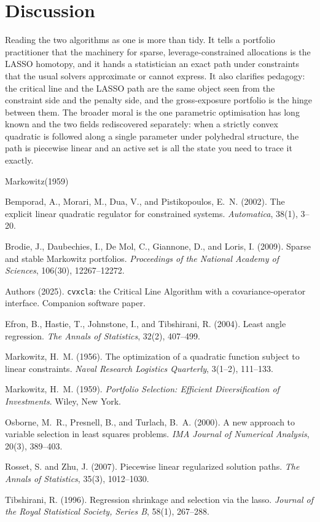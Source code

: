 \documentclass[11pt]{article}
\begin{document}
\section{Discussion}

Reading the two algorithms as one is more than tidy. It tells a portfolio
practitioner that the machinery for sparse, leverage-constrained allocations is the
LASSO homotopy, and it hands a statistician an exact path under constraints that the
usual solvers approximate or cannot express. It also clarifies pedagogy: the
critical line and the LASSO path are the same object seen from the constraint side
and the penalty side, and the gross-exposure portfolio is the hinge between them.
The broader moral is the one parametric optimisation has long known and the two
fields rediscovered separately: when a strictly convex quadratic is followed along a
single parameter under polyhedral structure, the path is piecewise linear and an
active set is all the state you need to trace it exactly.

\begin{thebibliography}{Markowitz(1959)}

 Bemporad, A., Morari, M., Dua, V., and
Pistikopoulos, E.~N. (2002). The explicit linear quadratic regulator for constrained
systems. \emph{Automatica}, 38(1), 3--20.

 Brodie, J., Daubechies, I., De Mol, C.,
Giannone, D., and Loris, I. (2009). Sparse and stable Markowitz portfolios.
\emph{Proceedings of the National Academy of Sciences}, 106(30), 12267--12272.

 Authors (2025). \texttt{cvxcla}: the Critical Line
Algorithm with a covariance-operator interface. Companion software paper.

 Efron, B., Hastie, T., Johnstone, I., and
Tibshirani, R. (2004). Least angle regression. \emph{The Annals of Statistics},
32(2), 407--499.

 Markowitz, H.~M. (1956). The optimization of
a quadratic function subject to linear constraints. \emph{Naval Research Logistics
Quarterly}, 3(1--2), 111--133.

 Markowitz, H.~M. (1959). \emph{Portfolio
Selection: Efficient Diversification of Investments}. Wiley, New York.

 Osborne, M.~R., Presnell, B., and
Turlach, B.~A. (2000). A new approach to variable selection in least squares
problems. \emph{IMA Journal of Numerical Analysis}, 20(3), 389--403.

 Rosset, S. and Zhu, J. (2007). Piecewise
linear regularized solution paths. \emph{The Annals of Statistics}, 35(3),
1012--1030.

 Tibshirani, R. (1996). Regression
shrinkage and selection via the lasso. \emph{Journal of the Royal Statistical
Society, Series B}, 58(1), 267--288.

\end{thebibliography}
\end{document}
